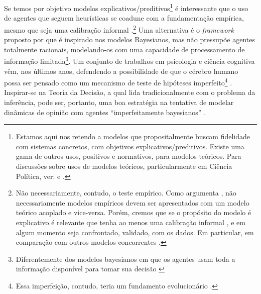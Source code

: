 Se temos por objetivo modelos explicativos/preditivos\footnote{Estamos aqui nos
  retendo a modelos que propositalmente buscam fidelidade com sistemas
  concretos, com objetivos explicativos/preditivos. Existe uma gama de outros
  usos, positivos e normativos, para modelos teóricos. Para discussões sobre
  usos de modelos teóricos, particularmente em Ciência Política, ver:
   e .} é interessante
que o uso de agentes que seguem heurísticas se coadune com a fundamentação
empírica, mesmo que seja uma calibração informal \cite{flache2017}.\footnote{Não
  necessariamente, contudo, o teste empírico. Como argumenta
  , não necessariamente modelos empíricos devem ser
  apresentados com um modelo teórico acoplado e vice-versa. Porém, cremos que se
  o propósito do modelo é explicativo  é relevante que tenha  ao menos uma calibração
  informal \cite{flache2017}, e em algum momento seja confrontado, validado,
  com os dados. Em particular, em comparação com outros modelos concorrentes
  \cite{clarke2012model}. } Uma alternativa é o \textit{framework} proposto por
 que é inspirado nos modelos Bayesianos, mas não
pressupõe agentes totalmente racionais, modelando-os com uma capacidade de
processamento de informação limitada\footnote{Diferentemente dos modelos
  bayesianos em que os agentes usam toda a informação disponível para tomar sua
  decisão \cite{jackman2009bayesian}}. Um conjunto de trabalhos em psicologia e
ciência cognitiva vêm, nos últimos anos, defendendo a possibilidade de que o
cérebro humano possa ser pensado como um mecanismo de teste de hipóteses
imperfeito\footnote{Essa imperfeição, contudo, teria um fundamento evolucionário
  \cite{price2016hierarchical,martins2005adaptive}.}
\cite{hohwy2013predictive,sanborn2016bayesian}. Inspirar-se na Teoria da
Decisão, a qual lida tradicionalmente com o problema da inferência, pode ser,
portanto, uma boa estratégia na tentativa de modelar dinâmicas de opinião com
agentes ``imperfeitamente bayesianos''
\cite{griffiths2006optimal,fujikawa2007perfect,baker2017rational}.


